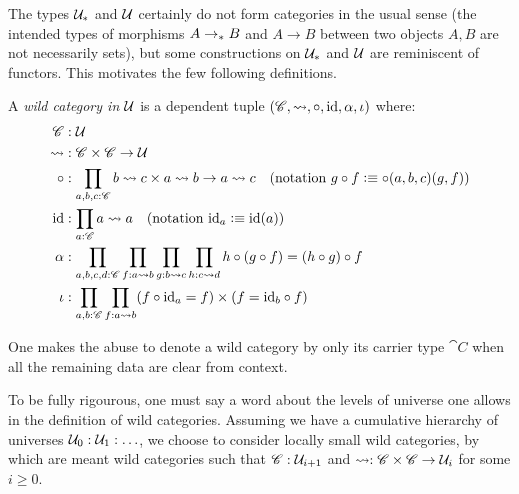 \documentclass[english,a4paper]{lmcs}
\begin{document}

\label{sec:wild-functors}
\def\hom(#1,#2){#1 \rightsquigarrow #2}
%
The types $\mathcal{U}_*$ and $\mathcal{U}$ certainly do not form categories in the usual
sense (the intended types of morphisms $A \to_\ast B$ and $A\to B$ between two
objects $A,B$ are not necessarily sets), but some constructions on $\mathcal{U}_*$ and $\mathcal{U}$ are
reminiscent of functors. This motivates the few following definitions.

\begin{defi}
  A \emph{wild category in} $\mathcal{U}$ is a dependent tuple $(\cat C, \hom( , ), \circ, \id, \alpha,
  \iota)$ where:
  \begin{align*}
    \cat C&: \UU \\
    \hom( , )&: \cat C \times \cat C \to \UU \\
    \circ&: \prod_{a,b,c:\cat C} \hom(b,c) \times \hom(a,b) \to \hom(a,c)
    \quad (\text{notation}\ g\circ f \defequi \circ(a,b,c)(g,f)) \\
    \id&: \prod_{a:\cat C} \hom(a,a) \quad (\text{notation}\ \id_a \defequi \id(a)) \\
    \alpha&: \prod_{a,b,c,d:\cat C} \prod_{f:\hom(a,b)} \prod_{g:\hom(b,c)} \prod_{h:\hom(c,d)}
    h\circ (g \circ f) = (h \circ g) \circ f \\
    \iota&: \prod_{a,b:\cat C} \prod_{f:\hom(a,b)} (f\circ \id_a = f) \times (f = \id_b \circ f)
  \end{align*}
  \label{defn:wild-cat}
\end{defi}
One makes the abuse to denote a wild category by only its carrier type $\cat C$ when
all the remaining data are clear from context.

\begin{rem}
  To be fully rigourous, one must say a word about the levels of universe one
  allows in the definition of wild categories. Assuming we have a cumulative
  hierarchy of universes $\mathcal{U}_0 : \mathcal{U}_1 : \ldots$, we choose to consider
  locally small wild categories, by which are meant wild categories such that
  $\mathscr{C}:\mathcal{U}_{i+1}$ and $\hom(,): \cat C \times \cat C \to \UU_i$ for some
  $i\geq 0$.
  \label{rem:universes-locally-small-cats}
\end{rem}
\end{document}
